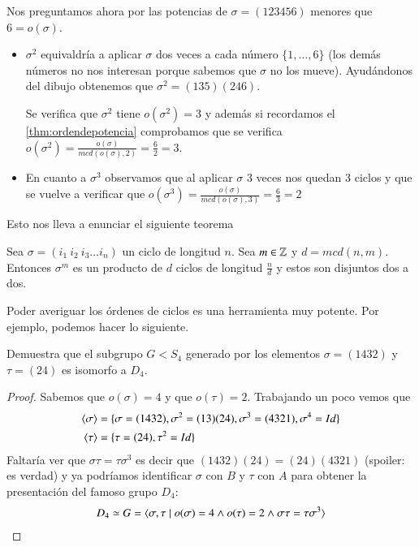 \begin{ej}
	Nos preguntamos ahora por las potencias de $\sigma = (123456)$ menores que $6 = o(\sigma)$.
	\begin{itemize}
		\item $\sigma^2$ equivaldría a aplicar $\sigma$ dos veces a cada número $\{1, \dots, 6\}$ (los demás números no nos interesan porque sabemos que $\sigma$ no los mueve). Ayudándonos del dibujo obtenemos que $\sigma^2 = (135)(246)$.
		
		Se verifica que $\sigma^2$ tiene $o(\sigma^2) = 3$ y además si recordamos el \autoref{thm:ordendepotencia} comprobamos que se verifica $o(\sigma^2) = \frac{o(\sigma)}{mcd(o(\sigma), 2)} = \frac{6}{2} = 3$.
		
		\item En cuanto a $\sigma^3$ observamos que al aplicar $\sigma$ 3 veces nos quedan 3 ciclos y que se vuelve a verificar que $o(\sigma^3) =\frac{o(\sigma)}{mcd(o(\sigma), 3)} = \frac{6}{3} = 2$
	\end{itemize}
\end{ej}

Esto nos lleva a enunciar el siguiente teorema

\begin{thm}
	\label{thm:ordenpotenciasciclos}
	Sea $\sigma = (i_1\ i_2\ i_3 \dots i_n)$ un ciclo de longitud $n$. Sea $m \in \mathbb{Z}$ y $d = mcd(n,m)$. Entonces $\sigma^m$ es un producto de $d$ ciclos de longitud $\frac{n}{d}$ y estos son disjuntos dos a dos.
\end{thm}

Poder averiguar los órdenes de ciclos es una herramienta muy potente. Por ejemplo, podemos hacer lo siguiente.

\begin{ex}[H3.8]
	Demuestra que el subgrupo $G < S_4$ generado por los elementos $\sigma = (1432)$ y $\tau = (24)$ es isomorfo a $D_4$.
\end{ex}

\begin{proof}
	Sabemos que $o(\sigma) = 4$ y que $o(\tau) = 2$. Trabajando un poco vemos que
	\begin{align*}
		\langle\sigma\rangle &= \{\sigma = (1432), \sigma^2 = (13)(24), \sigma^3 = (4321), \sigma^4 = Id\} \\
		\langle\tau\rangle &= \{\tau = (24), \tau^2 = Id\}
	\end{align*}
	Faltaría ver que $\sigma \tau = \tau \sigma^3$ es decir que $(1432)(24) = (24)(4321)$ (spoiler: es verdad) y ya podríamos identificar $\sigma$ con $B$ y $\tau$ con $A$ para obtener la presentación del famoso grupo $D_4$:
	\begin{align*}
		D_4 \simeq G = \langle\sigma, \tau \mid o(\sigma) = 4 \land o(\tau) = 2 \land \sigma \tau = \tau \sigma^3\rangle
	\end{align*}
\end{proof}

